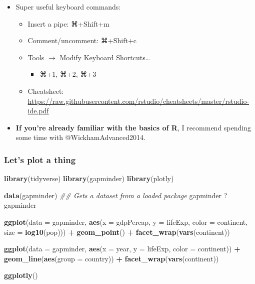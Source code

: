 \documentclass[
]{article}
\newenvironment{Shaded}{\begin{snugshade}}{\end{snugshade}}
\newcommand{\CommentTok}[1]{\textcolor[rgb]{0.56,0.35,0.01}{\textit{#1}}}
\newcommand{\DataTypeTok}[1]{\textcolor[rgb]{0.13,0.29,0.53}{#1}}
\newcommand{\KeywordTok}[1]{\textcolor[rgb]{0.13,0.29,0.53}{\textbf{#1}}}
\newcommand{\NormalTok}[1]{#1}
\newcommand{\OperatorTok}[1]{\textcolor[rgb]{0.81,0.36,0.00}{\textbf{#1}}}
\newcommand{\StringTok}[1]{\textcolor[rgb]{0.31,0.60,0.02}{#1}}
\providecommand{\tightlist}{%
  \setlength{\itemsep}{0pt}\setlength{\parskip}{0pt}}
\begin{document}
\begin{itemize}
\tightlist
\item
  Super useful keyboard commands:

  \begin{itemize}
  \tightlist
  \item
    Insert a pipe: ⌘+Shift+m
  \item
    Comment/uncomment: ⌘+Shift+c
  \item
    Tools \(\to\) Modify Keyboard Shortcuts\ldots{}

    \begin{itemize}
    \tightlist
    \item
      ⌘+1, ⌘+2, ⌘+3
    \end{itemize}
  \item
    Cheatsheet: \url{https://raw.githubusercontent.com/rstudio/cheatsheets/master/rstudio-ide.pdf}
  \end{itemize}
\item
  \textbf{If you're already familiar with the basics of R}, I recommend spending some time with @WickhamAdvanced2014.
\end{itemize}

\hypertarget{lets-plot-a-thing}{%
\subsubsection{Let's plot a thing}\label{lets-plot-a-thing}}

\begin{Shaded}
\begin{Highlighting}[]
\KeywordTok{library}\NormalTok{(tidyverse)}
\KeywordTok{library}\NormalTok{(gapminder)}
\KeywordTok{library}\NormalTok{(plotly)}

\KeywordTok{data}\NormalTok{(gapminder) }\CommentTok{\#\# Gets a dataset from a loaded package}
\NormalTok{gapminder}
\NormalTok{?gapminder}

\KeywordTok{ggplot}\NormalTok{(}\DataTypeTok{data =}\NormalTok{ gapminder, }\KeywordTok{aes}\NormalTok{(}\DataTypeTok{x =}\NormalTok{ gdpPercap, }\DataTypeTok{y =}\NormalTok{ lifeExp, }\DataTypeTok{color =}\NormalTok{ continent, }
                             \DataTypeTok{size =} \KeywordTok{log10}\NormalTok{(pop))) }\OperatorTok{+}
\StringTok{  }\KeywordTok{geom\_point}\NormalTok{() }\OperatorTok{+}
\StringTok{  }\KeywordTok{facet\_wrap}\NormalTok{(}\KeywordTok{vars}\NormalTok{(continent))}

\KeywordTok{ggplot}\NormalTok{(}\DataTypeTok{data =}\NormalTok{ gapminder, }\KeywordTok{aes}\NormalTok{(}\DataTypeTok{x =}\NormalTok{ year, }\DataTypeTok{y =}\NormalTok{ lifeExp, }\DataTypeTok{color =}\NormalTok{ continent)) }\OperatorTok{+}
\StringTok{  }\KeywordTok{geom\_line}\NormalTok{(}\KeywordTok{aes}\NormalTok{(}\DataTypeTok{group =}\NormalTok{ country)) }\OperatorTok{+}
\StringTok{  }\KeywordTok{facet\_wrap}\NormalTok{(}\KeywordTok{vars}\NormalTok{(continent))}

\KeywordTok{ggplotly}\NormalTok{()}
\end{Highlighting}
\end{Shaded}
\end{document}
